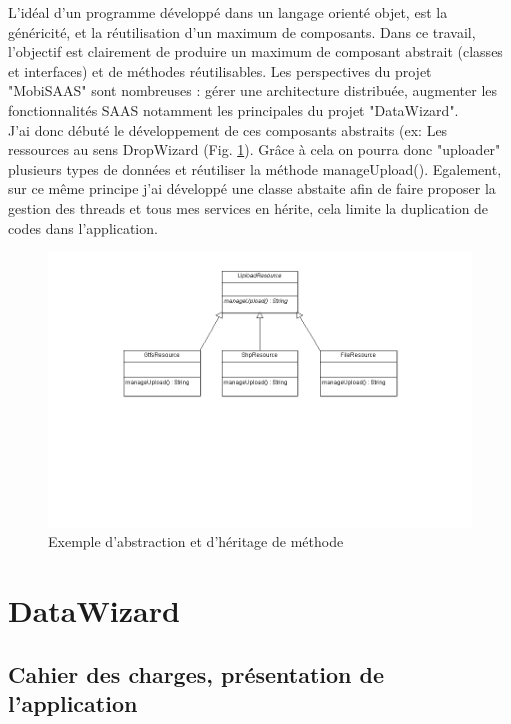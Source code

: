 \begin{itemize}
L'idéal d'un programme développé dans un langage orienté objet, est la généricité, et la réutilisation d'un maximum de composants. Dans ce travail, l'objectif est clairement de produire un maximum de composant abstrait (classes et interfaces) et de méthodes réutilisables. Les perspectives du projet "MobiSAAS" sont nombreuses : gérer une architecture distribuée, augmenter les fonctionnalités SAAS notamment les principales du projet "DataWizard".\\

J'ai donc débuté le développement de ces composants abstraits (ex: Les ressources au sens DropWizard (Fig. \ref{UML1}). Grâce à cela on pourra donc "uploader" plusieurs types de données et réutiliser la méthode manageUpload(). Egalement, sur ce même principe j'ai développé une classe abstaite afin de faire proposer la gestion des threads et tous mes services en hérite, cela limite la duplication de codes dans l'application.\\
\begin{figure}[!h]
\centering
\includegraphics[width=14cm]{images/Diagrammedeclasses_heritage_full.png}
\caption{\label{UML1}Exemple d'abstraction et d'héritage de méthode}
\end{figure} 

\pagebreak

\section{DataWizard}

\subsection{Cahier des charges, présentation de l'application}


\end{itemize}
